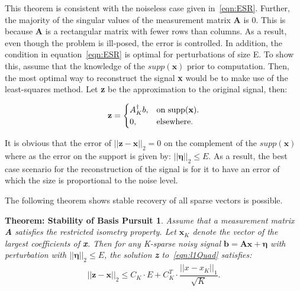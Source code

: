 \documentclass[titlepage,oneside, 12pt]{book}
\theoremstyle{break}
\begin{document}
This theorem is consistent with the noiseless case given in~\ref{eqn:ESR}. Further, the majority of the singular values of the measurement matrix \textbf{A} is 0. This is because \textbf{A} is a rectangular matrix with fewer rows than columns. As a result, even though the problem is ill-posed, the error is controlled.
In addition, the condition in equation~\ref{eqn:ESR} is optimal for perturbations of size E. To show this, assume that the knowledge of the $supp(\textbf{x})$ prior to computation. Then, the most optimal way to reconstruct the signal \textbf{x} would be to make use of the least-squares method. Let \textbf{z} be the approximation to the original signal, then:


\begin{equation}
\begin{gathered}
\textbf{z}=
  \begin{cases}
    A_{K}^{\dagger}b, &\text{on supp(\textbf{x})}.\\
    0, & \text{elsewhere}.
  \end{cases}
\end{gathered}
\label{eqn:SBP-Cond}
\end{equation}

It is obvious that the error of $||\textbf{z} - \textbf{x}||_2 = 0$ on the complement of the $supp(\textbf{x})$ where as the error on the support is given by: $||\pmb{\eta}||_2 \leq E$. As a result, the best case scenario for the reconstruction of the signal is for it to have an error of which the size is proportional to the noise level.   

The following theorem shows stable recovery of all sparse vectors is possible\cite{SSR}.

\newtheorem*{Stab2}{Theorem: Stability of Basis Pursuit}
\begin{Stab2}
Assume that a measurement matrix \textbf{A} satisfies the restricted isometry property. Let $\textbf{x}_K$ denote the vector of the largest coefficients of \textbf{x}. Then for any K-sparse noisy signal $\textbf{b} = \textbf{Ax} + \pmb{\eta}$ with perturbation  with $||\pmb{\eta}||_2 \leq E$, the solution  \textbf{z} to~\ref{eqn:l1Quad} satisfies: 
\begin{equation}
\begin{gathered}
||\textbf{z} - \textbf{x}||_2 \leq C_K \cdot E + C_K^{T} \cdot \dfrac{||x - x_{K}||_1}{\sqrt{K}}.
\end{gathered}
\label{eqn:SBP2}
\end{equation}

\end{Stab2}
\end{document}
